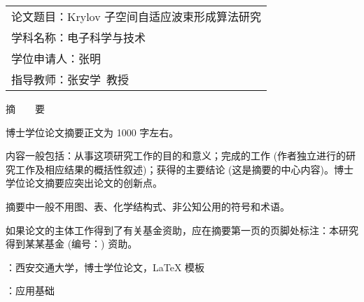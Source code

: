 
\setcounter{page}{1}

\begin{table}[!ht]\xiaosi\hei\vskip-1.5mm
	\begin{tabular}{@{}l}
		论文题目：Krylov 子空间自适应波束形成算法研究 \\
		学科名称：电子科学与技术 \\
		学位申请人：张明 \\
		指导教师：张安学~教授
	\end{tabular}
\end{table}

\noindent\parbox[c][15mm][c]{\textwidth}{\centering\sanhao 摘~~~~要}

博士学位论文摘要正文为 1000 字左右。

内容一般包括：从事这项研究工作的目的和意义；完成的工作 (作者独立进行的研究工作及相应结果的概括性叙述)；获得的主要结论 (这是摘要的中心内容)。博士学位论文摘要应突出论文的创新点。

摘要中一般不用图、表、化学结构式、非公知公用的符号和术语。

如果论文的主体工作得到了有关基金资助，应在摘要第一页的页脚处标注：本研究得到某某基金 (编号：) 资助。

\vspace{\baselineskip}
{ \hangindent=50.7pt
	：西安交通大学，博士学位论文，\LaTeX{} 模板
	
	\vspace{\baselineskip}
	：应用基础
}

\clearpage



